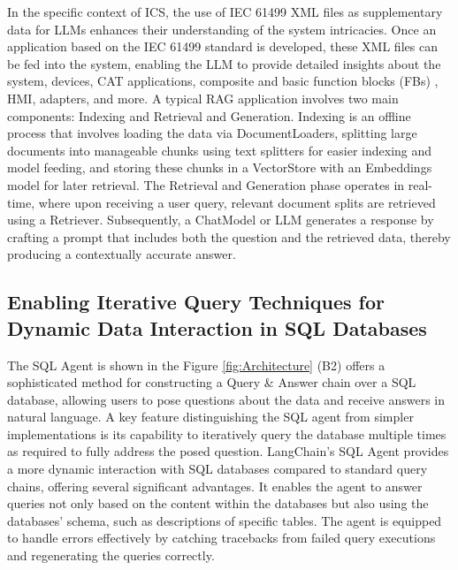 \documentclass[conference]{IEEEtran}
\begin{document}
In the specific context of ICS, the use of IEC 61499 XML files as supplementary data for LLMs enhances their understanding of the system intricacies. Once an application based on the IEC 61499 standard is developed, these XML files can be fed into the system, enabling the LLM to provide detailed insights about the system, devices, CAT applications, composite and basic function blocks (FBs) , HMI, adapters, and more. A typical RAG application involves two main components: Indexing and Retrieval and Generation. Indexing is an offline process that involves loading the data via DocumentLoaders, splitting large documents into manageable chunks using text splitters for easier indexing and model feeding, and storing these chunks in a VectorStore with an Embeddings model for later retrieval. The Retrieval and Generation phase operates in real-time, where upon receiving a user query, relevant document splits are retrieved using a Retriever. Subsequently, a ChatModel or LLM generates a response by crafting a prompt that includes both the question and the retrieved data, thereby producing a contextually accurate answer.


\subsection{Enabling Iterative Query Techniques  for Dynamic Data Interaction in SQL Databases} 

The SQL Agent is shown in the Figure \ref{fig:Architecture} (B2) offers a sophisticated method for constructing a Query \& Answer chain over a SQL database, allowing users to pose questions about the data and receive answers in natural language. A key feature distinguishing the SQL agent from simpler implementations is its capability to iteratively query the database multiple times as required to fully address the posed question. LangChain's SQL Agent provides a more dynamic interaction with SQL databases compared to standard query chains, offering several significant advantages. It enables the agent to answer queries not only based on the content within the databases but also using the databases’ schema, such as descriptions of specific tables. The agent is equipped to handle errors effectively by catching tracebacks from failed query executions and regenerating the queries correctly. 
\end{document}
